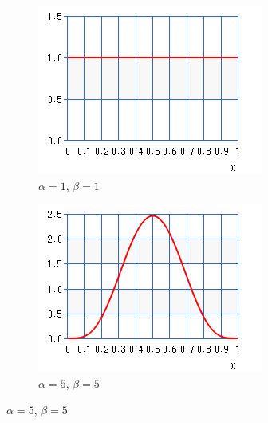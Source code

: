 \begin{figure}[htbp]
      \begin{subfigure}{0.5\textwidth}
            \includegraphics[width=\textwidth]{images/beta_1_1.png}
            \caption{$\alpha=1$, $\beta=1$}
            \label{sec:bhh:hyper_parameters:normalisation_beta_1_1}
      \end{subfigure}
      \begin{subfigure}{0.5\textwidth}
            \includegraphics[width=\textwidth]{images/beta_5_5.png}
            \caption{$\alpha=5$, $\beta=5$}
            \label{sec:bhh:hyper_parameters:normalisation_beta_5_5}
      \end{subfigure}
      \par\bigskip

\end{figure}
